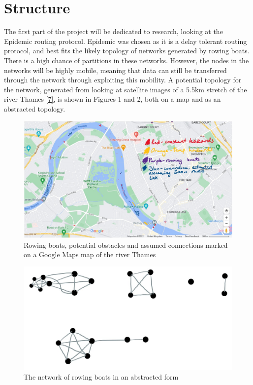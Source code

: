 \documentclass[10pt, a4paper]{article}
\begin{document}
\section*{Structure}
The first part of the project will be dedicated to research, looking at the Epidemic routing protocol. Epidemic was chosen as it is a delay tolerant routing protocol, and best fits the likely topology of networks generated by rowing boats. There is a high chance of partitions in these networks. However, the nodes in the networks will be highly mobile, meaning that data can still be transferred through the network through exploiting this mobility. A potential topology for the network, generated from looking at satellite images of a 5.5km stretch of the river Thames \hyperref[googlemaps]{[7]}, is shown in Figures 1 and 2, both on a map and as an abstracted topology.
\begin{figure}[h]
\caption{Rowing boats, potential obstacles and assumed connections marked on a Google Maps map of the river Thames}
\begin{center}
\includegraphics[scale=0.5]{googlemaps.jpg}
\end{center}
\end{figure}
\begin{figure}[h]
\begin{center}
\caption{The network of rowing boats in an abstracted form}
\includegraphics[scale=0.5]{lines.jpg}
\end{center}
\end{figure}
\end{document}
